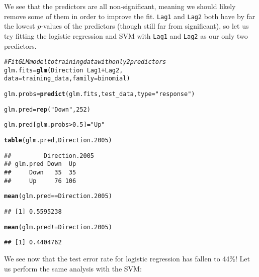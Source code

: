 \documentclass[12pt]{article}\usepackage[]{graphicx}\usepackage[]{color}
\makeatletter
\newcommand{\hlnum}[1]{\textcolor[rgb]{0.686,0.059,0.569}{#1}}%
\newcommand{\hlstr}[1]{\textcolor[rgb]{0.192,0.494,0.8}{#1}}%
\newcommand{\hlcom}[1]{\textcolor[rgb]{0.678,0.584,0.686}{\textit{#1}}}%
\newcommand{\hlopt}[1]{\textcolor[rgb]{0,0,0}{#1}}%
\newcommand{\hlstd}[1]{\textcolor[rgb]{0.345,0.345,0.345}{#1}}%
\newcommand{\hlkwb}[1]{\textcolor[rgb]{0.69,0.353,0.396}{#1}}%
\newcommand{\hlkwc}[1]{\textcolor[rgb]{0.333,0.667,0.333}{#1}}%
\newcommand{\hlkwd}[1]{\textcolor[rgb]{0.737,0.353,0.396}{\textbf{#1}}}%
\newenvironment{kframe}{%
 \def\at@end@of@kframe{}%
 \ifinner\ifhmode%
  \def\at@end@of@kframe{\end{minipage}}%
  \begin{minipage}{\columnwidth}%
 \fi\fi%
 \def\FrameCommand##1{\hskip\@totalleftmargin \hskip-\fboxsep
 \colorbox{shadecolor}{##1}\hskip-\fboxsep
     \hskip-\linewidth \hskip-\@totalleftmargin \hskip\columnwidth}%
 \MakeFramed {\advance\hsize-\width
   \@totalleftmargin\z@ \linewidth\hsize
   \@setminipage}}%
 {\par\unskip\endMakeFramed%
 \at@end@of@kframe}
\newenvironment{knitrout}{}{} %
\makeatother
\begin{document}
We see that the predictors are all non-significant, meaning we should likely remove some of them in order to improve the fit. \texttt{Lag1} and \texttt{Lag2} both have by far the lowest $p$-values of the predictors (though still far from significant), so let us try fitting the logistic regression and SVM with \texttt{Lag1} and \texttt{Lag2} as our only two predictors.

\begin{knitrout}
\color{fgcolor}\begin{kframe}
\begin{alltt}
\hlcom{#Fit GLM model to training data with only 2 predictors}
\hlstd{glm.fits} \hlkwb{=} \hlkwd{glm}\hlstd{(Direction}\hlopt{~}\hlstd{Lag1} \hlopt{+} \hlstd{Lag2,}
               \hlkwc{data} \hlstd{= training_data,} \hlkwc{family} \hlstd{= binomial)}

\hlstd{glm.probs} \hlkwb{=} \hlkwd{predict}\hlstd{(glm.fits, test_data,} \hlkwc{type}\hlstd{=}\hlstr{"response"}\hlstd{)}

\hlstd{glm.pred} \hlkwb{=} \hlkwd{rep}\hlstd{(}\hlstr{"Down"}\hlstd{,} \hlnum{252}\hlstd{)}

\hlstd{glm.pred[glm.probs}\hlopt{>}\hlnum{0.5}\hlstd{]} \hlkwb{=} \hlstr{"Up"}

\hlkwd{table}\hlstd{(glm.pred, Direction.2005)}
\end{alltt}
\begin{verbatim}
##         Direction.2005
## glm.pred Down  Up
##     Down   35  35
##     Up     76 106
\end{verbatim}
\begin{alltt}
\hlkwd{mean}\hlstd{(glm.pred} \hlopt{==} \hlstd{Direction.2005)}
\end{alltt}
\begin{verbatim}
## [1] 0.5595238
\end{verbatim}
\begin{alltt}
\hlkwd{mean}\hlstd{(glm.pred} \hlopt{!=} \hlstd{Direction.2005)}
\end{alltt}
\begin{verbatim}
## [1] 0.4404762
\end{verbatim}
\end{kframe}
\end{knitrout}

We see now that the test error rate for logistic regression has fallen to 44\%! Let us perform the same analysis with the SVM:
\end{document}
